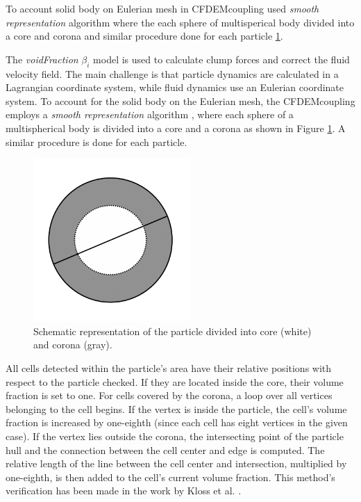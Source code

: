 To account solid body on Eulerian mesh in CFDEMcoupling \cite{kloss2012models} used \textit{smooth representation} \cite{kloss2012models} algorithm where the each sphere of multisperical body divided into a core and corona and similar procedure done for each particle \ref{fig:core}. 

The \textit{voidFraction} $\beta_i$ model is used to calculate clump forces and correct the fluid velocity field. The main challenge is that particle dynamics are calculated in a Lagrangian coordinate system, while fluid dynamics use an Eulerian coordinate system. To account for the solid body on the Eulerian mesh, the CFDEMcoupling employs a \textit{smooth representation} algorithm \cite{kloss2012models}, where each sphere of a multispherical body is divided into a core and a corona as shown in Figure \ref{fig:core}. A similar procedure is done for each particle.
\begin{figure}[ht]
    \centering
    \includegraphics[width=6cm]{Images/chap3/core_corona.png}
    \caption{Schematic representation of the particle divided into core (white) and corona (gray).}
    \label{fig:core}
\end{figure}
All cells detected within the particle's area have their relative positions with respect to the particle checked. If they are located inside the core, their volume fraction is set to one. For cells covered by the corona, a loop over all vertices belonging to the cell begins. If the vertex is inside the particle, the cell's volume fraction is increased by one-eighth (since each cell has eight vertices in the given case). If the vertex lies outside the corona, the intersecting point of the particle hull and the connection between the cell center and edge is computed. The relative length of the line between the cell center and intersection, multiplied by one-eighth, is then added to the cell's current volume fraction. This method's verification has been made in the work by Kloss et al. \cite{kloss2012models}.

